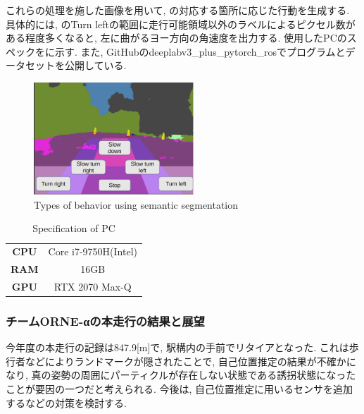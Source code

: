 \documentclass[uplatex, twocolumn, 9pt]{jsproceedings}
\begin{document}
これらの処理を施した画像を用いて, の対応する箇所に応じた行動を生成する. 具体的には, のTurn leftの範囲に走行可能領域以外のラベルによるピクセル数がある程度多くなると, 左に曲がるヨー方向の角速度を出力する. 使用したPCのスペックをに示す. また, GitHubのdeeplabv3\_plus\_pytorch\_ros\cite{DeeplabV3}でプログラムとデータセットを公開している.

\begin{figure}[h]
  \centering
  \includegraphics[width=60mm]{fig/seg.pdf}
  \caption{Types of behavior using semantic segmentation}
  \label{fig:seg}%
\end{figure}

\begin{table}
  \centering
  \caption{Specification of PC}
  \label{table:pc}
  \begin{tabular}{cc}
  \toprule%
  \textbf{CPU} & Core i7-9750H(Intel)\\
  \textbf{RAM} & 16GB\\
  \textbf{GPU} & RTX 2070 Max-Q\\
  \bottomrule%
  \end{tabular}
\end{table}


\subsubsection{チームORNE-αの本走行の結果と展望}
今年度の本走行の記録は847.9[m]で, 駅構内の手前でリタイアとなった. これは歩行者などによりランドマークが隠されたことで, 自己位置推定の結果が不確かになり, 真の姿勢の周囲にパーティクルが存在しない状態である誘拐状態\cite{emcl-thesis}になったことが要因の一つだと考えられる. 今後は, 自己位置推定に用いるセンサを追加するなどの対策を検討する. 
\end{document}
